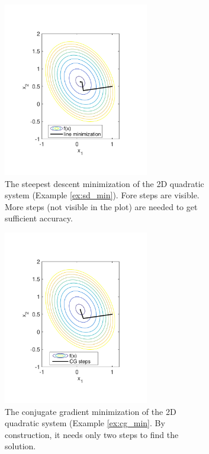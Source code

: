 \begin{example}
\begin{figure}
\centering
	\begin{subfigure}{0.45\textwidth}
		\centering
		\includegraphics[width=2.5in]{08.matrix1/sd_min.pdf}
\caption{The steepest descent minimization of the 2D quadratic system (Example \ref{ex:sd_min}).  Fore steps are visible.  More steps (not visible in the plot) are needed to get sufficient accuracy.}
\label{fig:sd_min}
	\end{subfigure}
	\begin{subfigure}{0.45\textwidth}
		\centering
		\includegraphics[width=2.5in]{08.matrix1/cg_min.pdf}
\caption{The conjugate gradient minimization of the 2D quadratic system (Example \ref{ex:cg_min}.  By construction, it needs only two steps to find the solution.}
\label{fig:cg_min}
	\end{subfigure}
\\
	\begin{subfigure}{4.5in}
		\centering

\end{subfigure}
\end{figure}
\end{example}
